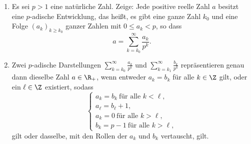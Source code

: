 \begin{prob}
  \begin{enumerate}[label=(\alph*)]
  \item Es sei $p > 1$ eine natürliche Zahl. Zeige: Jede positive reelle Zahl $a$
    besitzt eine $p$-adische Entwicklung, das heißt, es gibt eine ganze Zahl
    $k_0$ und eine Folge $(a_k)_{k \geq k_0}$ ganzer Zahlen mit $0 \leq a_k < p$,
    so dass
    \begin{equation*}
      a = \sum_{k=k_0}^{\infty}\frac{a_k}{p^k}.
    \end{equation*}
  \item Zwei $p$-adische Darstellungen
    $\displaystyle\sum_{k=k_0}^{\infty} \frac{a_k}{p^k}$ und
    $\displaystyle\sum_{k=k_1}^{\infty} \frac{b_k}{p^k}$ repräsentieren genau dann
    dieselbe Zahl $a \in \R_+$, wenn entweder $a_k = b_k$ für alle $k \in \Z$
    gilt, oder ein $\ell \in \Z$ existiert, sodass
    \begin{equation*}
      \begin{cases}
        a_k = b_k\ \text{für alle } k < \ell, \\
        a_\ell = b_\ell + 1,                  \\
        a_k = 0\ \text{für alle } k > \ell,   \\
        b_k = p-1\ \text{für alle } k > \ell,
      \end{cases}
    \end{equation*}
    gilt oder dasselbe,  mit den Rollen der $a_k$ und $b_k$ vertauscht, gilt.
  \end{enumerate}
\end{prob}
